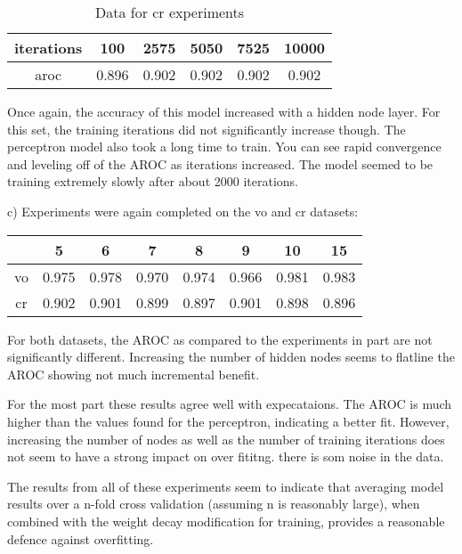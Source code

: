 \documentclass[12pt]{article}
\begin{document}
\begin{table}[ht!]
    \begin{tabular}{|c|c|c|c|c|c|} 
    \hline
    iterations & 100   & 2575  & 5050  & 7525  & 10000 \\ \hline
    aroc       & 0.896 & 0.902 & 0.902 & 0.902 & 0.902  \\
    \hline
    \end{tabular}
    \caption{Data for cr experiments}
\end{table}

Once again, the accuracy of this model increased with a hidden node layer. For this set, the training iterations
did not significantly increase though. The perceptron model also took a long time to train. You can see rapid convergence
and leveling off of the AROC as iterations increased. The model seemed to be training extremely slowly after about 2000 iterations.

c) Experiments were again completed on the vo and cr datasets: 

\begin{table}[!hb]
    \begin{tabular}{|c|c|c|c|c|c|c|c|}
    \hline
        & 5   &  6  &  7  &  8  &  9  &  10  & 15   \\ \hline \hline
      vo&0.975&0.978&0.970&0.974&0.966&0.981 & 0.983\\ \hline
      cr&0.902&0.901&0.899&0.897&0.901&0.898 &0.896 \\ \hline
    \end{tabular}
\end{table}

For both datasets, the AROC as compared to the experiments in part are not significantly 
different. Increasing the number of hidden nodes seems to flatline the AROC showing not 
much incremental benefit. 

For the most part these results agree well with expecataions. The AROC is much 
higher than the values found for the perceptron, indicating a better fit. However, 
increasing the number of nodes as well as the number of training iterations does not seem to 
have a strong impact on over fititng. there is som noise in the data. 

The results from all of these experiments seem to indicate that averaging model results over 
a n-fold cross validation (assuming n is reasonably large), when combined with the weight 
decay modification for training, provides a reasonable defence against overfitting. 
\end{document}
